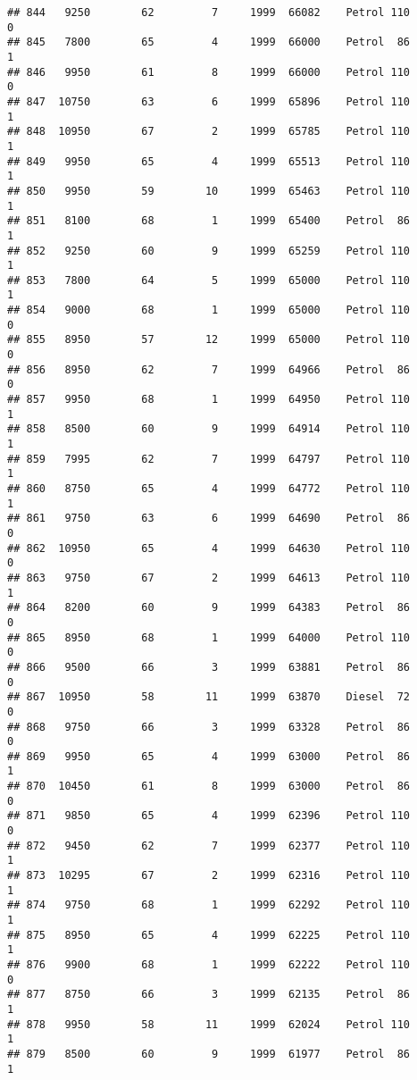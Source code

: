 \documentclass[]{article}
\begin{document}
\begin{verbatim}
## 844   9250        62         7     1999  66082    Petrol 110         0
## 845   7800        65         4     1999  66000    Petrol  86         1
## 846   9950        61         8     1999  66000    Petrol 110         0
## 847  10750        63         6     1999  65896    Petrol 110         1
## 848  10950        67         2     1999  65785    Petrol 110         1
## 849   9950        65         4     1999  65513    Petrol 110         1
## 850   9950        59        10     1999  65463    Petrol 110         1
## 851   8100        68         1     1999  65400    Petrol  86         1
## 852   9250        60         9     1999  65259    Petrol 110         1
## 853   7800        64         5     1999  65000    Petrol 110         1
## 854   9000        68         1     1999  65000    Petrol 110         0
## 855   8950        57        12     1999  65000    Petrol 110         0
## 856   8950        62         7     1999  64966    Petrol  86         0
## 857   9950        68         1     1999  64950    Petrol 110         1
## 858   8500        60         9     1999  64914    Petrol 110         1
## 859   7995        62         7     1999  64797    Petrol 110         1
## 860   8750        65         4     1999  64772    Petrol 110         1
## 861   9750        63         6     1999  64690    Petrol  86         0
## 862  10950        65         4     1999  64630    Petrol 110         0
## 863   9750        67         2     1999  64613    Petrol 110         1
## 864   8200        60         9     1999  64383    Petrol  86         0
## 865   8950        68         1     1999  64000    Petrol 110         0
## 866   9500        66         3     1999  63881    Petrol  86         0
## 867  10950        58        11     1999  63870    Diesel  72         0
## 868   9750        66         3     1999  63328    Petrol  86         0
## 869   9950        65         4     1999  63000    Petrol  86         1
## 870  10450        61         8     1999  63000    Petrol  86         0
## 871   9850        65         4     1999  62396    Petrol 110         0
## 872   9450        62         7     1999  62377    Petrol 110         1
## 873  10295        67         2     1999  62316    Petrol 110         1
## 874   9750        68         1     1999  62292    Petrol 110         1
## 875   8950        65         4     1999  62225    Petrol 110         1
## 876   9900        68         1     1999  62222    Petrol 110         0
## 877   8750        66         3     1999  62135    Petrol  86         1
## 878   9950        58        11     1999  62024    Petrol 110         1
## 879   8500        60         9     1999  61977    Petrol  86         1

\end{verbatim}
\end{document}
